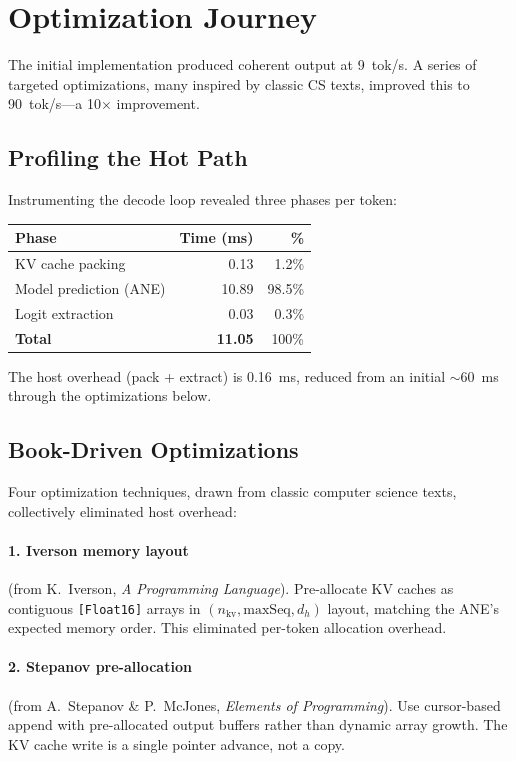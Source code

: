\documentclass[11pt,twocolumn]{article}
\begin{document}
\section{Optimization Journey}
\label{sec:opt}

The initial implementation produced coherent output at 9~tok/s. A
series of targeted optimizations, many inspired by classic CS texts,
improved this to 90~tok/s---a 10$\times$ improvement.

\subsection{Profiling the Hot Path}

Instrumenting the decode loop revealed three phases per token:

\begin{center}
\footnotesize
\begin{tabular}{lrr}
\toprule
\textbf{Phase} & \textbf{Time (ms)} & \textbf{\%} \\
\midrule
KV cache packing & 0.13 & 1.2\% \\
Model prediction (ANE) & 10.89 & 98.5\% \\
Logit extraction & 0.03 & 0.3\% \\
\midrule
\textbf{Total} & \textbf{11.05} & 100\% \\
\bottomrule
\end{tabular}
\end{center}

The host overhead (pack + extract) is 0.16~ms, reduced from an
initial $\sim$60~ms through the optimizations below.

\subsection{Book-Driven Optimizations}

Four optimization techniques, drawn from classic computer science
texts, collectively eliminated host overhead:

\paragraph{1. Iverson memory layout} (from K.~Iverson, \textit{A
Programming Language}). Pre-allocate KV caches as contiguous
\texttt{[Float16]} arrays in $(n_\text{kv}, \text{maxSeq}, d_h)$
layout, matching the ANE's expected memory order. This eliminated
per-token allocation overhead.

\paragraph{2. Stepanov pre-allocation} (from A.~Stepanov \& P.~McJones,
\textit{Elements of Programming}). Use cursor-based append with
pre-allocated output buffers rather than dynamic array growth. The KV
cache write is a single pointer advance, not a copy.
\end{document}
